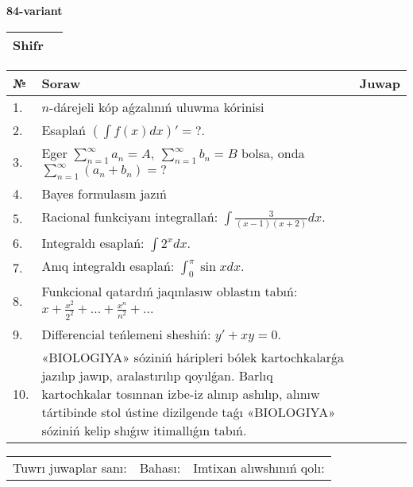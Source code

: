 \documentclass{article}
\begin{document}
  \egroup
  
  \newpage
  
  
  \textbf{84-variant}\\
  
  \bgroup
  \def\arraystretch{1.6} %
  
  \begin{tabular}{|m{5.7cm}|m{9.5cm}|}
  \hline
  Shifr & \\
  \hline
  \end{tabular}
  
  \vspace{1cm}
  
  \begin{tabular}{|m{0.7cm}|m{10cm}|m{4cm}|}
  \hline
  № & Soraw & Juwap \\
  \hline
  1. & \(n\)-dárejeli kóp aǵzalınıń uluwma kórinisi &  \\
  \hline
  2. & Esaplań \(\left( \int{f(x)dx} \right)' = ?\). &  \\
  \hline
  3. & Eger \(\sum_{n = 1}^{\infty}a_{n} = A,\ \sum_{n = 1}^{\infty}b_{n} = B\) bolsa, onda \(\sum_{n = 1}^{\infty}\left( a_{n} + b_{n} \right) = ?\) &  \\
  \hline
  4. & Bayes formulasın jazıń &  \\
  \hline
  5. & Racional funkciyanı integrallań: \(\int{\frac{3}{(x - 1)(x + 2)}dx}\). &  \\
  \hline
  6. & Integraldı esaplań: \(\int{2^{x}dx}\). &  \\
  \hline
  7. & Anıq integraldı esaplań: \(\int_{0}^{\pi}{\sin xdx}\). &  \\
  \hline
  8. & Funkcional qatardıń jaqınlasıw oblastın tabıń: \(x + \frac{x^2 }{2^2 } + ... + \frac{x^{n}}{n^2 } + ...\) &  \\
  \hline
  9. & Differencial teńlemeni sheshiń: \(y' + xy = 0\). &  \\
  \hline
  10. & «BIOLOGIYA» sóziniń háripleri bólek kartochkalarǵa jazılıp jawıp, aralastırılıp qoyılǵan. Barlıq kartochkalar tosınnan izbe-iz alınıp ashılıp, alınıw tártibinde stol ústine dizilgende taǵı «BIOLOGIYA» sóziniń kelip shıǵıw itimallıǵın tabıń. &  \\
  \hline
  \end{tabular}
  
  \vspace{1cm}
  
  \begin{tabular}{lll}
  Tuwrı juwaplar sanı: \underline{\hspace{1.5cm}} & 
  Bahası: \underline{\hspace{1.5cm}} & 
  Imtixan alıwshınıń qolı: \underline{\hspace{2cm}} \\
  \end{tabular}
  
\end{document}
